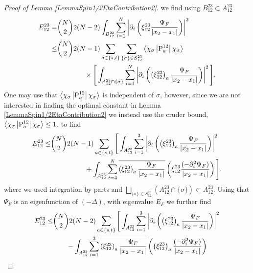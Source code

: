 \begin{proof}[Proof of Lemma \ref{LemmaSpin1/2EtaContribution2}]
 we find using $ B_{12}^{23}\subset A_{12}^{23} $
\begin{equation}
\begin{aligned}
E_{12}^{23}=&\binom{N}{2}2(N-2)\int_{B_{12}^{23}}\sum_{i=1}^{N}\left\lvert \partial_i\left(\xi_{12}^{23} \frac{\Psi_F}{\left\lvert x_2-x_1 \right\rvert}\right) \right\rvert^2\\
\leq& \binom{N}{2}2(N-1)\sum_{a\in\{s,t\}}\sum_{\{\sigma\}\in S_{12}^{23}}\left\langle\chi_{\sigma}\left\lvert \operatorname{P}_a^{12}\right \rvert \chi_{\sigma}\right\rangle\\&\qquad\qquad\times\Bigg[\int_{A_{12}^{23}\cap\{\sigma\}}\sum_{i=1}^{N}\left\lvert \partial_i\left(\left(\xi_{12}^{23}\right)_a \frac{\Psi_F}{\left\lvert x_2-x_1 \right\rvert}\right) \right\rvert^2\Bigg].
\end{aligned}
\end{equation}
One may use that $ \left\langle\chi_{\sigma}\left\lvert \operatorname{P}_a^{12}\right \rvert \chi_{\sigma}\right\rangle $ is independent of $ \sigma $, however, since we are not interested in finding the optimal constant in Lemma \ref{LemmaSpin1/2EtaContribution2} we instead use the cruder bound, $ \left\langle\chi_{\sigma}\left\lvert \operatorname{P}_a^{12}\right \rvert \chi_{\sigma}\right\rangle\leq 1 $, to find
\begin{equation}\label{key}
\begin{aligned}
E_{12}^{23}\leq& \binom{N}{2}2(N-1)\sum_{a\in\{s,t\}}\Bigg[\int_{A_{12}^{23}}\sum_{i=1}^{3}\left\lvert \partial_i\left(\left(\xi_{12}^{23}\right)_a \frac{\Psi_F}{\left\lvert x_2-x_1 \right\rvert}\right) \right\rvert^2 \\&\qquad\qquad\quad+\int_{A_{12}^{23}}\sum_{i=4}^{N}\overline{\left(\xi_{12}^{23}\right)_a \frac{\Psi_F}{\left\lvert x_2-x_1 \right\rvert}}\left(\xi_{12}^{23} \frac{(-\partial_i^2\Psi_F)}{\left\lvert x_2-x_1 \right\rvert}\right)\Bigg].
\end{aligned}
\end{equation}
where we used integration by parts and $ \bigsqcup_{\{\sigma\}\in S_{12}^{23}}\left(A_{12}^{23}\cap \{\sigma\}\right)\subset A_{12}^{23} $.  Using that $ \Psi_F $ is an eigenfunction of $ (-\Delta) $, with eigenvalue $ E_F $ we further find
\begin{equation}
\begin{aligned}
E_{12}^{23}\leq& \binom{N}{2}2(N-2)\sum_{a\in\{s,t\}}\Bigg[\int_{A_{12}^{23}}\sum_{i=1}^{3}\abs{\partial_i\left(\left(\xi_{12}^{23}\right)_a \frac{\Psi_F}{\abs{x_2-x_1}}\right)}^2 \\&\qquad-\int_{A_{12}^{23}}\sum_{i=1}^{3}\overline{\left(\xi_{12}^{23}\right)_a \frac{\Psi_F}{\abs{x_2-x_1}}}\left(\left(\xi_{12}^{23}\right)_a \frac{(-\partial_i^2\Psi_F)}{\abs{x_2-x_1}}\right)\\

\end{aligned}
\end{equation}
\end{proof}
